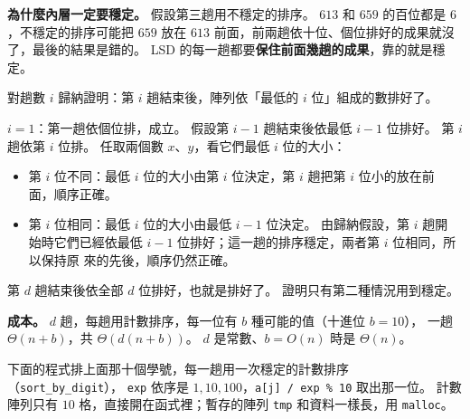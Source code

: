 \textbf{為什麼內層一定要穩定。} 假設第三趟用不穩定的排序。 $613$ 和 $659$ 的百位都是
$6$，不穩定的排序可能把 $659$ 放在 $613$ 前面，前兩趟依十位、個位排好的成果就沒
了，最後的結果是錯的。 LSD 的每一趟都要\textbf{保住前面幾趟的成果}，靠的就是穩定。

\begin{whybox}
對趟數 $i$ 歸納證明：第 $i$ 趟結束後，陣列依「最低的 $i$ 位」組成的數排好了。

$i = 1$：第一趟依個位排，成立。 假設第 $i - 1$ 趟結束後依最低 $i - 1$ 位排好。 第
$i$ 趟依第 $i$ 位排。 任取兩個數 $x$、$y$，看它們最低 $i$ 位的大小：
\begin{itemize}
\item 第 $i$ 位不同：最低 $i$ 位的大小由第 $i$ 位決定，第 $i$ 趟把第 $i$ 位小的放在前
面，順序正確。
\item 第 $i$ 位相同：最低 $i$ 位的大小由最低 $i - 1$ 位決定。 由歸納假設，第 $i$ 趟開
始時它們已經依最低 $i - 1$ 位排好；這一趟的排序穩定，兩者第 $i$ 位相同，所以保持原
來的先後，順序仍然正確。
\end{itemize}
第 $d$ 趟結束後依全部 $d$ 位排好，也就是排好了。 證明只有第二種情況用到穩定。
\end{whybox}

\textbf{成本。} $d$ 趟，每趟用計數排序，每一位有 $b$ 種可能的值（十進位 $b = 10$），
一趟 $\Theta(n + b)$，共 $\Theta(d(n + b))$。 $d$ 是常數、$b = O(n)$ 時是
$\Theta(n)$。

下面的程式排上面那十個學號，每一趟用一次穩定的計數排序（\texttt{sort\_by\_digit}），
\texttt{exp} 依序是 $1, 10, 100$，\texttt{a[j] / exp \% 10} 取出那一位。 計數陣列只有
$10$ 格，直接開在函式裡；暫存的陣列 \texttt{tmp} 和資料一樣長，用 \texttt{malloc}。

